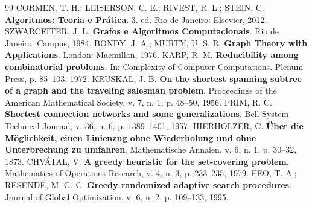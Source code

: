 \documentclass[12pt,a4paper]{article}
\begin{document}
\begin{thebibliography}{99}
     CORMEN, T. H.; LEISERSON, C. E.; RIVEST, R. L.; STEIN, C. \textbf{Algoritmos: Teoria e Prática}. 3. ed. Rio de Janeiro: Elsevier, 2012.
     SZWARCFITER, J. L. \textbf{Grafos e Algoritmos Computacionais}. Rio de Janeiro: Campus, 1984.
     BONDY, J. A.; MURTY, U. S. R. \textbf{Graph Theory with Applications}. London: Macmillan, 1976.
     KARP, R. M. \textbf{Reducibility among combinatorial problems}. In: Complexity of Computer Computations. Plenum Press, p. 85--103, 1972.
     KRUSKAL, J. B. \textbf{On the shortest spanning subtree of a graph and the traveling salesman problem}. Proceedings of the American Mathematical Society, v. 7, n. 1, p. 48--50, 1956.
     PRIM, R. C. \textbf{Shortest connection networks and some generalizations}. Bell System Technical Journal, v. 36, n. 6, p. 1389--1401, 1957.
     HIERHOLZER, C. \textbf{Über die Möglichkeit, einen Linienzug ohne Wiederholung und ohne Unterbrechung zu umfahren}. Mathematische Annalen, v. 6, n. 1, p. 30--32, 1873.
     CHVÁTAL, V. \textbf{A greedy heuristic for the set-covering problem}. Mathematics of Operations Research, v. 4, n. 3, p. 233--235, 1979.
     FEO, T. A.; RESENDE, M. G. C. \textbf{Greedy randomized adaptive search procedures}. Journal of Global Optimization, v. 6, n. 2, p. 109--133, 1995.
\end{thebibliography}
\end{document}
